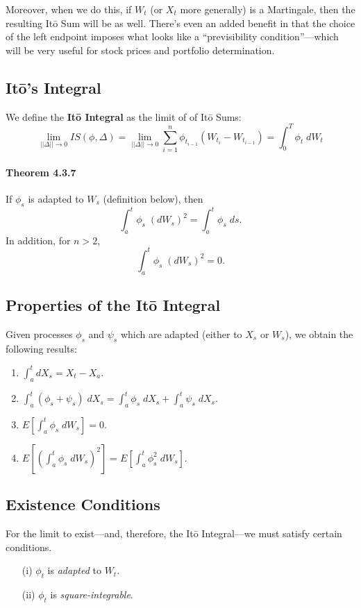 \documentclass[a4paper,12pt]{scrartcl}
\begin{document}
Moreover, when we do this, if $W_t$ (or $X_t$ more generally) is a 
Martingale, then the resulting It\={o} Sum will be as well. There's 
even an added benefit in that the choice of the left endpoint
imposes what looks like a ``previsibility condition''---which will
be very useful for stock prices and portfolio determination.

\subsection{It\={o}'s Integral}

We define the \textbf{It\={o} Integral} as the limit of of It\={o}
Sums:
   \[ \lim_{||\Delta|| \rightarrow 0}IS(\phi,\Delta) =  
      \lim_{||\Delta|| \rightarrow 0} \sum^n_{i=1} \phi_{t_{i-1}}(W_{t_i}
      -W_{t_{i-1}})= \int_0^T \phi_t \;dW_t \]

\paragraph{Theorem 4.3.7} If $\phi_s$ is adapted to $W_s$ (definition
below), then 
   \[ \int_a^t \phi_s \; (dW_s)^2 = \int_a^t \phi_s \; ds.\]
In addition, for $n>2$,
   \[ \int_a^t \phi_s \; (dW_s)^2 = 0. \]


\subsection{Properties of the It\={o} Integral}

Given processes $\phi_s$ and $\psi_s$ which are adapted (either to 
$X_s$ or $W_s$), we obtain the following results:
\begin{enumerate}
   \item{$\int_a^t dX_s = X_t - X_a$.}
   \item{$\int_a^t (\phi_s + \psi_s)\; dX_s = \int_a^t \phi_s \; dX_s + 
      \int_a^t \psi_s \; dX_s$.}
   \item{$E\left[\int_a^t \phi_s \;dW_s \right] = 0$.}
   \item{$E\left[\left(\int_a^t \phi_s \;dW_s\right)^2 \right] = 
      E\left[\int_a^t \phi^2_s \;dW_s \right]$.}
\end{enumerate}




\subsection{Existence Conditions}

For the limit to exist---and, therefore, the It\={o} Integral---we must
satisfy certain conditions.
\begin{enumerate}[]
   \item[(i)]{$\phi_t$ is \emph{adapted} to $W_t$.}
   \item[(ii)]{$\phi_t$ is \emph{square-integrable}.} 
\end{enumerate}
\end{document}
